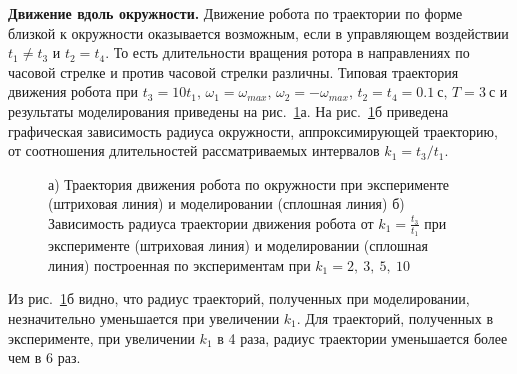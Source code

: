 \textbf{Движение вдоль окружности.} Движение робота по траектории по форме близкой к окружности оказывается возможным, если в управляющем воздействии $t_1 \neq t_3$ и $t_2 = t_4$. То есть длительности вращения ротора в направлениях по часовой стрелке и против часовой стрелки различны. Типовая траектория движения робота при $ t_3 = 10 t_1,\, \omega_1 = \omega_{max},\, \omega_2 = -\omega_{max},\, t_2 = t_4 = 0.1~\text{с},\, T = 3~\text{с} $
и результаты моделирования приведены на рис.~\ref{CircleTrajectory}а. На рис.~\ref{CircleTrajectory}б приведена графическая зависимость радиуса окружности, аппроксимирующей траекторию, от соотношения длительностей рассматриваемых интервалов $k_1 = t_3 / t_1$. 

\begin{figure}[!ht]
	\begin{minipage}[h]{0.25\linewidth}
	\end{minipage}
	\hfill
	\begin{minipage}[h]{0.6\linewidth}
	\end{minipage}
	\caption{а) Траектория движения робота по окружности при эксперименте (штриховая линия) и моделировании (сплошная линия)  б) Зависимость радиуса траектории движения робота от $k_1 = \frac{t_3}{t_1}$ при эксперименте (штриховая линия) и моделировании (сплошная линия) построенная по экспериментам при $k_1 = 2,\ 3,\ 5,\ 10$ }
	\label{CircleTrajectory}
\end{figure}


Из рис.~\ref{CircleTrajectory}б видно, что радиус траекторий, полученных при моделировании, незначительно уменьшается при увеличении $k_1$. Для траекторий, полученных в эксперименте, при увеличении $k_1$ в 4 раза, радиус траектории уменьшается более чем в 6 раз.

